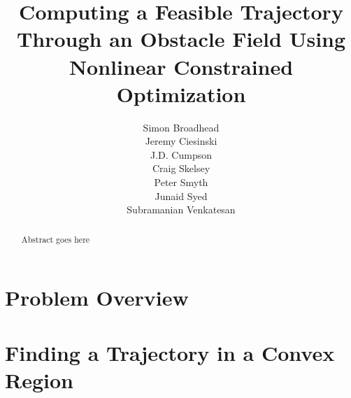 \documentclass{report}
\begin{document}
\title{Computing a Feasible Trajectory Through an Obstacle Field Using Nonlinear Constrained Optimization}
\author{
    Simon Broadhead\\
    Jeremy Ciesinski\\
    J.D. Cumpson\\
    Craig Skelsey\\
    Peter Smyth\\
    Junaid Syed\\
    Subramanian Venkatesan
}
\maketitle

\begin{abstract}
Abstract goes here
\end{abstract}

\chapter{Problem Overview}


\chapter{Finding a Trajectory in a Convex Region}
\end{document}
